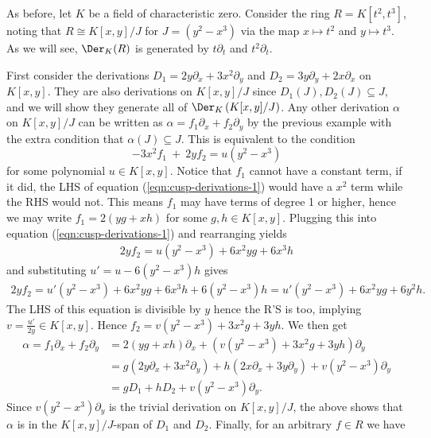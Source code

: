 \begin{example}\label{example:cusp-derivations}
	As before, let $K$ be a field of characteristic zero. Consider the ring $R = K[t^2,t^3]$, noting that $R \cong K[x,y]/J$ for $J = (y^2 - x^3)$ via the map $x\mapsto t^2$ and $y\mapsto t^3$. As we will see, $\Der_K(R)$ is generated by $t\partial_t$ and $t^2\partial_t$.

	First consider the derivations $D_1 = 2y\partial_x + 3x^2\partial_y$ and $D_2 = 3y\partial_y + 2x\partial_x$ on $K[x,y]$. They are also derivations on $K[x,y]/J$ since $D_1(J), D_2(J) \subseteq J$, and we will show they generate all of $\Der_K \left(K[x,y]/J\right)$. Any other derivation $\alpha$ on $K[x,y]/J$ can be written as $\alpha = f_1\partial_x + f_2\partial_y$ by the previous example with the extra condition that $\alpha(J)\subseteq J$. This is equivalent to the condition
	\begin{equation}\label{eqn:cusp-derivations-1}
		-3x^2f_1 ~+~ 2yf_2 = u(y^2 - x^3)
	\end{equation}
	for some polynomial $u \in K[x,y]$. Notice that $f_1$ cannot have a constant term, if it did, the LHS of equation (\ref{eqn:cusp-derivations-1}) would have a $x^2$ term while the RHS would not. This means $f_1$ may have terms of degree 1 or higher, hence we may write $f_1 = 2(yg + xh)$ for some $g, h \in K[x,y]$. Plugging this into equation (\ref{eqn:cusp-derivations-1}) and rearranging yields
	\begin{align*}
		2yf_2 = u(y^2 - x^3) + 6x^2yg + 6x^3h
	\end{align*}
	and substituting $u' = u - 6(y^2 - x^3)h$ gives
	\begin{align*}
		2yf_2 = u'(y^2 - x^3) + 6x^2yg + 6x^3h + 6(y^2 - x^3)h = u'(y^2 - x^3) + 6x^2yg + 6y^2h.
	\end{align*}
	The LHS of this equation is divisible by $y$ hence the R'S is too, implying $v = \frac{u'}{2y} \in K[x,y]$. Hence $f_2 = v(y^2 - x^3) + 3x^2g + 3yh$. We then get
	\begin{align*}
		\alpha = f_1\partial_x + f_2\partial_y 
		  &= 2(yg + xh)\partial_x + \left(v(y^2 - x^3) + 3x^2g + 3yh\right) \partial_y \\
		  &= g(2y\partial_x + 3x^2\partial_y) + h(2x\partial_x + 3y\partial_y) + v(y^2-x^3)\partial_y \\
		  &= gD_1 + hD_2 + v(y^2 - x^3)\partial_y.
	\end{align*}
	Since $v(y^2-x^3)\partial_y$ is the trivial derivation on $K[x,y]/J$, the above shows that $\alpha$ is in the $K[x,y]/J$-span of $D_1$ and $D_2$. Finally, for an arbitrary $f \in R$ we have

\end{example}
